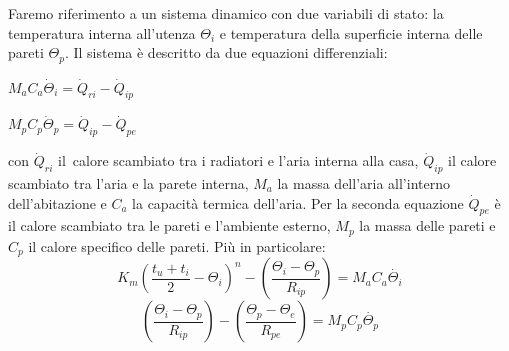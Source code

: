 \documentclass[laurea,oneside,11pt]{USiena_tesiLM}
\begin{document}
Faremo riferimento a un sistema dinamico con due variabili di stato: la temperatura interna all'utenza  $\Theta_i$  e  temperatura della superficie interna delle pareti  $\Theta_p$. Il sistema è  descritto  da due equazioni differenziali:
\begin{center}
$M_aC_a \dot{\Theta}_i = \dot{Q}_{ri} - \dot{Q}_{ip}$ 
\end{center}
\begin{center}
$M_pC_p \dot{\Theta}_p = \dot{Q}_{ip} - \dot{Q}_{pe}$
\end{center}
con $\dot{Q}_{ri}$ il\ calore scambiato tra i radiatori e l'aria interna alla casa, $\dot{Q}_{ip}$ il calore scambiato tra l'aria e la parete interna, $M_a$ la massa dell'aria all'interno dell'abitazione e $C_a$ la capacità termica dell'aria. Per la seconda equazione $ \dot{Q}_{pe}$ è il calore scambiato tra le pareti e l'ambiente esterno, $M_p$ la massa delle pareti e $C_p$ il calore specifico delle pareti.
Più in particolare:
\begin{equation}
K_m\left(\frac{t_u + t_i}{2} - \Theta_{i}\right)^n - \left(\frac{\Theta_{i} - \Theta_p}{R_{ip}}\right) = M_aC_a \dot{\Theta_i}
\end{equation}
\begin{equation}
\left(\frac{\Theta_{i} - \Theta_p}{R_{ip}}\right) - \left(\frac{\Theta_{p} - \Theta_e}{R_{pe}}\right) = M_pC_p \dot{\Theta_p}
\end{equation}
\end{document}

